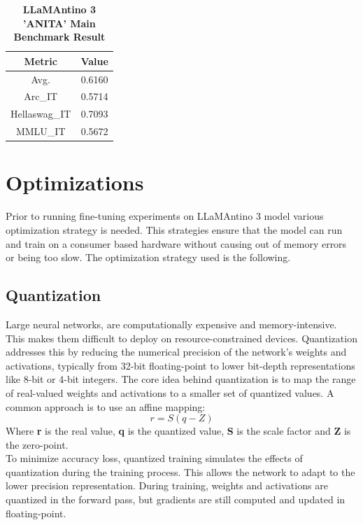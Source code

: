 \documentclass{article}
\begin{document}
	\begin{table}[h]
		\center
		\begin{tabular}{cc}
			\toprule
			\textbf{Metric} & \textbf{Value} \\
			\midrule
			Avg. & 0.6160 \\
			Arc\_IT & 0.5714 \\
			Hellaswag\_IT &	0.7093 \\
			MMLU\_IT & 0.5672 \\
			\bottomrule
		\end{tabular}
		\caption{\textbf{LLaMAntino 3 'ANITA' Main Benchmark Result}}
	\end{table}  

	\section{Optimizations}
	Prior to running fine-tuning experiments on LLaMAntino 3 model various optimization strategy is needed. This strategies ensure that the model can run and train on a consumer based hardware without causing out of memory errors or being too slow. 
	The optimization strategy used is the following.
	
	\subsection{Quantization}  
	Large neural networks, are computationally expensive and memory-intensive. This makes them difficult to deploy on resource-constrained devices. Quantization addresses this by reducing the numerical precision of the network's weights and activations, typically from 32-bit floating-point to lower bit-depth representations like 8-bit or 4-bit integers. The core idea behind quantization is to map the range of real-valued weights and activations to a smaller set of quantized values. A common approach is to use an affine mapping:
	\begin{equation}
		r=S(q-Z)
	\end{equation}
	Where \textbf{r} is the real value, \textbf{q} is the quantized value, \textbf{S} is the scale factor and \textbf{Z} is the zero-point. \\
	To minimize accuracy loss, quantized training simulates the effects of quantization during the training process. This allows the network to adapt to the lower precision representation. During training, weights and activations are quantized in the forward pass, but gradients are still computed and updated in floating-point.
	
\end{document}
